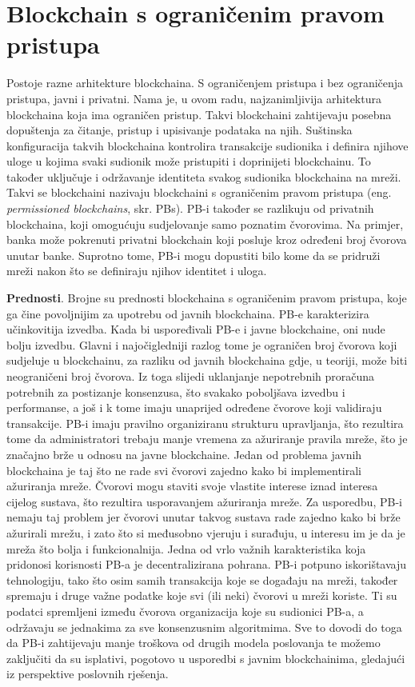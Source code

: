 \documentclass[times, utf8, diplomski]{fer}
\begin{document}
\chapter{Blockchain s ograničenim pravom pristupa}
Postoje razne arhitekture blockchaina. S ograničenjem pristupa i bez ograničenja pristupa, javni i privatni. Nama je, u ovom radu, najzanimljivija arhitektura blockchaina koja ima ograničen pristup. Takvi blockchaini zahtijevaju posebna dopuštenja za čitanje, pristup i upisivanje podataka na njih. Suštinska konfiguracija takvih blockchaina kontrolira transakcije sudionika i definira njihove uloge u kojima svaki sudionik može pristupiti i doprinijeti blockchainu. To također uključuje i održavanje identiteta svakog sudionika blockchaina na mreži. Takvi se blockchaini nazivaju blockchaini s ograničenim pravom pristupa (eng. \textit{permissioned blockchains}, skr. PBs). PB-i također se razlikuju od privatnih blockchaina, koji omogućuju sudjelovanje samo poznatim čvorovima. Na primjer, banka može pokrenuti privatni blockchain koji posluje kroz određeni broj čvorova unutar banke. Suprotno tome, PB-i mogu dopustiti bilo kome da se pridruži mreži nakon što se definiraju njihov identitet i uloga.

\textbf{Prednosti}. Brojne su prednosti blockchaina s ograničenim pravom pristupa, koje ga čine povoljnijim za upotrebu od javnih blockchaina. PB-e karakterizira učinkovitija izvedba. Kada bi uspoređivali PB-e i javne blockchaine, oni nude bolju izvedbu. Glavni i najočigledniji razlog tome je ograničen broj čvorova koji sudjeluje u blockchainu, za razliku od javnih blockchaina gdje, u teoriji, može biti neograničeni broj čvorova. Iz toga slijedi uklanjanje nepotrebnih proračuna potrebnih za postizanje konsenzusa, što svakako poboljšava izvedbu i performanse, a još i k tome imaju unaprijed određene čvorove koji validiraju transakcije. PB-i imaju pravilno organiziranu strukturu upravljanja, što rezultira tome da administratori trebaju manje vremena za ažuriranje pravila mreže, što je značajno brže u odnosu na javne blockchaine. Jedan od problema javnih blockchaina je taj što ne rade svi čvorovi zajedno kako bi implementirali ažuriranja mreže. Čvorovi mogu staviti svoje vlastite interese iznad interesa cijelog sustava, što rezultira usporavanjem ažuriranja mreže. Za usporedbu, PB-i nemaju taj problem jer čvorovi unutar takvog sustava rade zajedno kako bi brže ažurirali mrežu, i zato što si međusobno vjeruju i surađuju, u interesu im je da je mreža što bolja i funkcionalnija. Jedna od vrlo važnih karakteristika koja pridonosi korisnosti PB-a je decentralizirana pohrana. PB-i potpuno iskorištavaju tehnologiju, tako što osim samih transakcija koje se događaju na mreži, također spremaju i druge važne podatke koje svi (ili neki) čvorovi u mreži koriste. Ti su podatci spremljeni između čvorova organizacija koje su sudionici PB-a, a održavaju se jednakima za sve konsenzusnim algoritmima. Sve to dovodi do toga da PB-i zahtijevaju manje troškova od drugih modela poslovanja te možemo zaključiti da su isplativi, pogotovo u usporedbi s javnim blockchainima, gledajući iz perspektive poslovnih rješenja.
\end{document}
